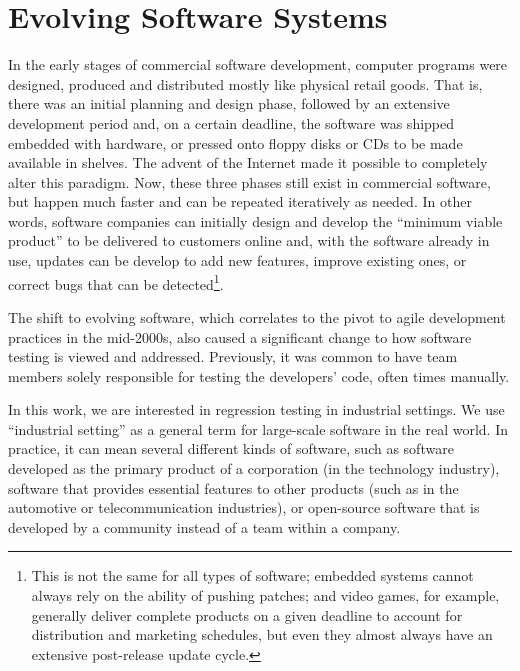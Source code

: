 \section{Evolving Software Systems}

In the early stages of commercial software development, computer programs were designed, produced and distributed mostly like physical retail goods.
That is, there was an initial planning and design phase, followed by an extensive development period and, on a certain deadline, the software was shipped embedded with hardware, or pressed onto floppy disks or CDs to be made available in shelves.
The advent of the Internet made it possible to completely alter this paradigm.
Now, these three phases still exist in commercial software, but happen much faster and can be repeated iteratively as needed.
In other words, software companies can initially design and develop the ``minimum viable product'' to be delivered to customers online and, with the software already in use, updates can be develop to add new features, improve existing ones, or correct bugs that can be detected\footnote{This is not the same for all types of software; embedded systems cannot always rely on the ability of pushing patches; and video games, for example, generally deliver complete products on a given deadline to account for distribution and marketing schedules, but even they almost always have an extensive post-release update cycle.}.

The shift to evolving software, which correlates to the pivot to agile development practices in the mid-2000s, also caused a significant change to how software testing is viewed and addressed.
Previously, it was common to have team members solely responsible for testing the developers' code, often times manually.

In this work, we are interested in regression testing in industrial settings.
We use ``industrial setting'' as a general term for large-scale software in the real world.
In practice, it can mean several different kinds of software, such as software developed as the primary product of a corporation (in the technology industry), software that provides essential features to other products (such as in the automotive or telecommunication industries), or open-source software that is developed by a community instead of a team within a company.





